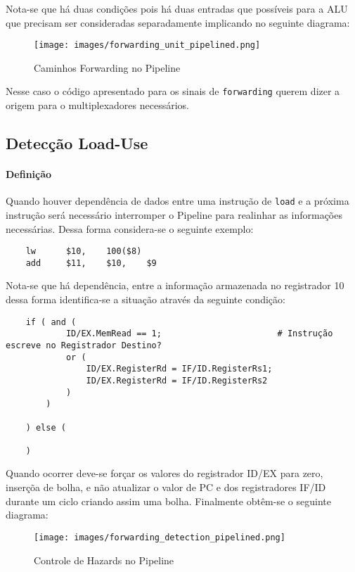\documentclass{article}
\begin{document}
\noindent Nota-se que há duas condições pois há duas entradas que possíveis para a ALU que precisam ser consideradas separadamente implicando no seguinte diagrama:
\begin{figure}[H]
    \centering
    \texttt{[image: images/forwarding\_unit\_pipelined.png]}
    \caption{Caminhos Forwarding no Pipeline}
    \label{forwardingPath}
\end{figure}
\noindent Nesse caso o código apresentado para os sinais de \texttt{forwarding} querem dizer a origem para o multiplexadores necessários.\\


\subsection{Detecção Load-Use}
\paragraph{Definição}Quando houver dependência de dados entre uma instrução de \texttt{load} e a próxima instrução será necessário interromper o Pipeline para realinhar as informações necessárias. Dessa forma considera-se o seguinte exemplo:
\begin{scriptsize}
    \myStyleRISCV
    \begin{lstlisting}
    lw      $10,    100($8)
    add     $11,    $10,    $9
    \end{lstlisting}
\end{scriptsize}
\noindent Nota-se que há dependência, entre a informação armazenada no registrador 10 dessa forma identifica-se a situação através da seguinte condição:
\begin{scriptsize}
    \myStyleRISCV
    \begin{lstlisting}
    if ( and (
            ID/EX.MemRead == 1;                       # Instrução escreve no Registrador Destino?
            or (
                ID/EX.RegisterRd = IF/ID.RegisterRs1;
                ID/EX.RegisterRd = IF/ID.RegisterRs2
            )
        )

    ) else (

    )
    \end{lstlisting}
\end{scriptsize}
\noindent Quando ocorrer deve-se forçar os valores do registrador ID/EX para zero, inserçõa de bolha, e não atualizar o valor de PC e dos registradores IF/ID durante um ciclo criando assim uma bolha. Finalmente obtêm-se o seguinte diagrama:
\begin{figure}[H]
    \centering
    \texttt{[image: images/forwarding\_detection\_pipelined.png]}
    \caption{Controle de Hazards no Pipeline}
    \label{controlHazardsPipeline}
\end{figure}
\end{document}
